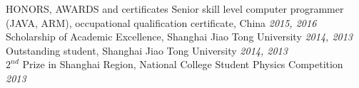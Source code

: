 \documentclass{resume} %
\begin{document}
\begin{rSection}{HONORS, AWARDS and certificates}
Senior skill level computer programmer (JAVA, ARM), occupational qualification certificate, China \hfill \emph{2015, 2016}
\\Scholarship of Academic Excellence, Shanghai Jiao Tong University \hfill \emph{2014, 2013}
\\Outstanding student, Shanghai Jiao Tong University \hfill \emph{2014, 2013}
\\$2^{nd}$ Prize in Shanghai Region, National College Student Physics Competition \hfill \emph{2013}
\end{rSection}





\end{document}
